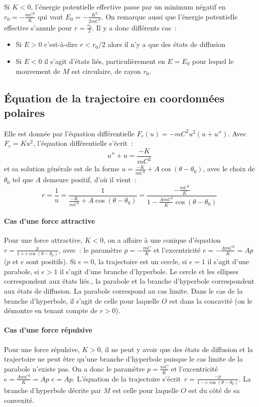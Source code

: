 Si \(K < 0\), l'énergie potentielle effective passe par un minimum négatif en
\(r_0 = -\frac{mC^2}{K}\) qui vaut \(E_0 = -\frac{K^2}{2mC^2}\). On remarque
aussi que l'énergie potentielle effective s'annule pour \(r = \frac{r_0}{2}\).
Il y a donc différents cas~:
\begin{itemize}%
  \item Si \(E>0\) c'est-à-dire \(r<r_0/2\) alors il n'y a que des états de
    diffusion
  \item Si \(E<0\) il s'agit d'états liés, particulièrement en \(E = E_0\) pour
    lequel le mouvement de \(M\) est circulaire, de rayon \(r_0\).
\end{itemize}%
\subsection{Équation de la trajectoire en coordonnées polaires}%
Elle est donnée par l'équation différentielle \(F_r(u) = -mC^2u^2(u+u'')\).
Avec \(F_r = Ku^2\), l'équation différentielle s'écrit~:
\begin{equation}%
  u'' + u = \frac{-K}{mC^2}
\end{equation}%
et sa solution générale est de la forme \(u = \frac{-K}{mC^2} +
A\cos(\theta-\theta_0)\), avec le choix de \(\theta_0\) tel que \(A\) demeure
positif, d'où il vient~:
\begin{equation}%
  r = \frac{1}{u} = \frac{1}{\frac{-K}{mC^2} + A\cos(\theta - \theta_0)} =
  \frac{-\frac{mC^2}{K}}{1 - \frac{AmC^2}{K}\cos(\theta - \theta_0)}
\end{equation}%
\paragraph{Cas d'une force attractive}%
Pour une force attractive, \(K < 0\), on a affaire à une conique d'équation \(r
= \frac{p}{1 + e\cos(\theta - \theta_0)}\), avec~: le paramètre \(p =
-\frac{mC}{K}\) et l'excentricité \(e = -\frac{AmC^2}{K} = Ap\) (\(p\) et \(e\)
sont positifs). Si \(e=0\), la trajectoire est un cercle, si \(e=1\) il s'agit
d'une parabole, si \(e>1\) il s'agit d'une branche d'hyperbole. Le cercle et
les ellipses correspondent aux états liés., la parabole et la branche
d'hyperbole correspondent aux états de diffusion. La parabole correspond au cas
limite. Dans le cas de la branche d'hyperbole, il s'agit de celle pour laquelle
\(O\) est dans la concavité (on le démontre en tenant compte de \(r>0\)).
\paragraph{Cas d'une force répulsive}%
Pour une force répulsive, \(K > 0\), il ne peut y avoir que des états de
diffusion et la trajectoire ne peut être qu'une branche d'hyperbole puisque le
cas limite de la parabole n'existe pas. On a donc le paramètre \(p =
\frac{mC}{K}\) et l'excentricité \(e = \frac{AmC^2}{K} = Ap\) \(e = Ap\). %
L'équation de la trajectoire s'écrit~\(r = \frac{-p}{1 - e\cos(\theta -
\theta_0)}\). La branche d'hyperbole décrite par \(M\) est celle pour laquelle
\(O\) est du côté de sa convexité.

